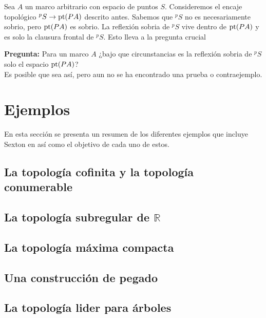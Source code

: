 Sea $A$ un marco arbitrario con espacio de puntos $S$. Consideremos el encaje topológico $^pS\to \mathrm{pt}(PA)$ descrito antes. Sabemos que $^pS$ no es necesariamente sobrio, pero $\mathrm{pt}(PA)$ es sobrio. La reflexión sobria de $^pS$ vive dentro de $\mathrm{pt}(PA)$ y es solo la clausura frontal de $^pS$. Esto lleva a la pregunta crucial

\textbf{Pregunta:} Para un marco $A$ ¿bajo que circunstancias es la reflexión sobria de $^pS$ solo el espacio $\mathrm{pt}(PA)$?\\

Es posible que sea así, pero aun no se ha encontrado una prueba o contraejemplo.

\section{Ejemplos}\label{Ejemplos Rosy}

En esta sección se presenta un resumen de los diferentes ejemplos que incluye Sexton en \cite{R.S.} así como el objetivo de cada uno de estos.

\subsection{La topología cofinita y la topología conumerable}

\subsection{La topología subregular de $\mathbb{R}$}

\subsection{La topología máxima compacta}

\subsection{Una construcción de pegado}

\subsection{La topología lider para árboles}